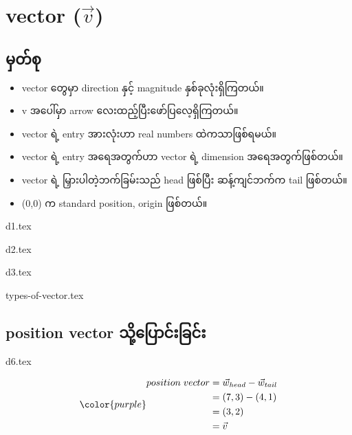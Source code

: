 \section{vector ($\vec{v}$)}
\subsection{မှတ်စု}
{\begin{itemize}
        \item vector တွေမှာ direction နှင့် magnitude နှစ်ခုလုံးရှိကြတယ်။
        \item v အပေါ်မှာ arrow လေးထည့်ပြီးဖော်ပြလေ့ရှိကြတယ်။
        \item vector ရဲ့ entry အားလုံးဟာ real numbers ထဲကသာဖြစ်ရမယ်။
        \item vector ရဲ့ entry အရေအတွက်ဟာ vector ရဲ့ dimension အရေအတွက်ဖြစ်တယ်။
        \item vector ရဲ့ မြှားပါတဲ့ဘက်ခြမ်းသည် head ဖြစ်ပြီး ဆန့်ကျင်ဘက်က tail ဖြစ်တယ်။
        \item (0,0) က standard position, origin ဖြစ်တယ်။
    \end{itemize}}
\begin{minipage}{0.45\textwidth}
    \centering
    {d1.tex}
\end{minipage}
\hfill
\begin{minipage}{0.45\textwidth}
    \centering
    {d2.tex}
\end{minipage}
\clearpage
\begin{center}
    {d3.tex}
\end{center}
{types-of-vector.tex}
\subsection{position vector သို့ပြောင်းခြင်း}
\begin{center}
    {d6.tex}
\end{center}
\begin{equation}
    {\color{purple} \begin{split}
        position\hspace{1mm}vector & = \vec{w}_{head} - \vec{w}_{tail} \\
                        & = (7,3) - (4,1) \\
                        & = (3,2) \\
                        & = \vec{v}
    \end{split}}
\end{equation}